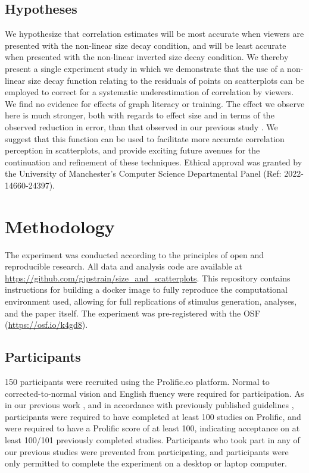 \documentclass{vgtc}                          %
\begin{document}
\hypertarget{hypotheses}{%
\subsection{Hypotheses}\label{hypotheses}}

We hypothesize that correlation estimates will be most accurate when
viewers are presented with the non-linear size decay condition, and will be
least accurate when presented with the non-linear inverted size decay condition.
We thereby present a single experiment study in which we demonstrate that the use of
a non-linear size decay function relating to the residuals of points on scatterplots
can be employed to correct for a systematic underestimation of correlation by
viewers. We find no evidence for effects of graph literacy or training.
The effect we observe here is much stronger, both
with regards to effect size and in terms of the observed reduction in error, than that
observed in our previous study \cite{strain_2023}. We suggest that this
function can be used to facilitate more accurate correlation
perception in scatterplots, and provide exciting future avenues for the continuation
and refinement of these techniques. Ethical approval was granted by the University
of Manchester's Computer Science Departmental Panel (Ref: 2022-14660-24397).

\hypertarget{methodology}{%
\section{Methodology}\label{methodology}}

The experiment was conducted according to the principles of open and reproducible research.
All data and analysis code are available at \url{https://github.com/gjpstrain/size_and_scatterplots}.
This repository contains instructions for building a docker image to fully
reproduce the computational environment used, allowing for full replications
of stimulus generation, analyses, and the paper itself. The experiment was
pre-registered with the OSF (\url{https://osf.io/k4gd8}).

\hypertarget{participants}{%
\subsection{Participants}\label{participants}}

150 participants were recruited using the Prolific.co platform. Normal to
corrected-to-normal vision and English fluency were required for participation. As in our previous work
\cite{strain_2023}, and in accordance with previously published guidelines \cite{peer_2021},
participants were required to have completed at least 100 studies on Prolific, and were
required to have a Prolific score of at least 100, indicating acceptance on at least
100/101 previously completed studies. Participants who took part in any of our
previous studies were prevented from participating, and participants were only
permitted to complete the experiment on a desktop or laptop computer.
\end{document}
